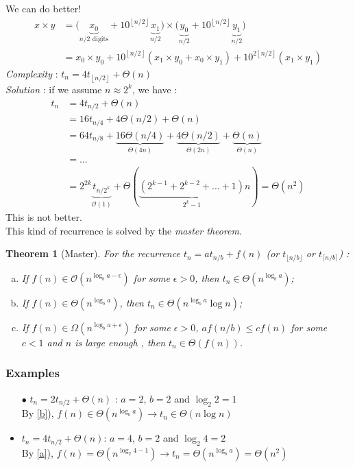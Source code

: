 \documentclass[12pt,a4paper]{report}
\theoremstyle{break}
\newtheorem{theorem}{Theorem}
\begin{document}
We can do better!\\
\begin{align*}
x\times y&=\big(\underbrace{x_0}_{n/2 \text{ digits}}+10^{\left\lfloor n/2\right\rfloor} \underbrace{x_1}_{n/2}\big)\times \big(\underbrace{y_0}_{n/2}+10^{\left\lfloor n/2\right\rfloor} \underbrace{y_1}_{n/2}\big)\\
&=x_0 \times y_0 + 10^{\left\lfloor n/2\right\rfloor} (x_1 \times y_0 + x_0 \times y_1)+10^{2{\left\lfloor n/2\right\rfloor}}(x_1\times y_1)
\end{align*}
\emph{Complexity} : $t_n=4t_{\left\lfloor n/2\right\rfloor}+\Theta(n)$\\
\emph{Solution} : if we assume $n\approx 2^k$, we have : 
\begin{align*}
t_n&=4t_{n/2}+\Theta(n)\\
&=16t_{n/4}+4 \Theta(n/2)+\Theta(n)\\
&=64t_{n/8}+\underbrace{16\Theta(n/4)}_{\Theta(4n)}+\underbrace{4 \Theta(n/2)}_{\Theta(2n)}+\underbrace{\Theta(n)}_{\Theta(n)}\\
&=\hdots\\
&=2^{2k}\underbrace{t_{n/2^k}}_{\mathcal{O}(1)}+\Theta(\underbrace{(2^{k-1}+2^{k-2}+\hdots+1)}_{2^k-1}n)=\Theta(n^2)
\end{align*}
This is not better.\\
This kind of recurrence is solved by the \emph{master theorem}.\\
\begin{theorem}[Master]
For the recurrence $t_n=at_{n/b}+f(n)$ (or $t_{\lfloor n/b \rfloor}$ or $t_{\lceil n/b \rceil}$) : 
\begin{enumerate}[a)]
\item If $f(n)\in \mathcal{O}\left(n^{\log_ba-\epsilon}\right)$ for some $\epsilon>0$, then $t_n \in \Theta\left(n^{\log_ba}\right)$;\label{a}
\item If $f(n)\in \Theta\left(n^{\log_ba}\right)$, then $t_n \in \Theta\left(n^{\log_ba}\log n\right)$; \label{b}
\item If $f(n)\in \Omega\left(n^{\log_ba+\epsilon}\right)$ for some $\epsilon>0$, $af(n/b)\leq cf(n)$ for some $c<1$ and $n$ is large enough , then $t_n \in \Theta\left( f(n)\right)$.\\
\end{enumerate}
\end{theorem}

\subsubsection*{Examples}
\begin{itemize}
\item[$\bullet$] $t_n=2t_{n/2}+\Theta(n)$ : $a=2$, $b=2$ and $\log_2 2=1$\\
By \ref{b}), $f(n)\in \Theta\left(n^{\log_ba}\right)\rightarrow t_n \in \Theta(n\log n)$
\item $t_n=4t_{n/2}+\Theta(n)$: $a=4$, $b=2$ and $\log_2 4=2$\\
By \ref{a}), $f(n)=\Theta\left(n^{\log_2 4-1}\right)\rightarrow t_n=\Theta\left(n^{\log_ba}\right)=\Theta\left(n^2\right)$
\end{itemize}
\end{document}
